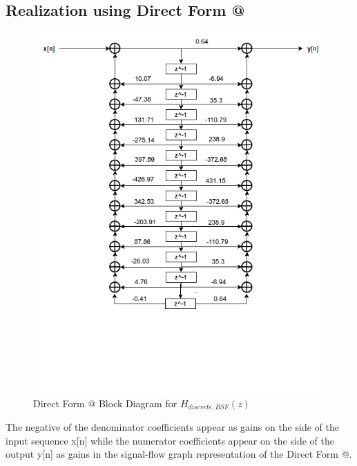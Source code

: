 \documentclass[12pt]{article}
\makeatletter
\newcommand{\Rmnum}[1]{\expandafter\@slowromancap\romannumeral #1@}
\makeatother
\begin{document}
\subsection{Realization using Direct Form \Rmnum{2}}
\begin{figure}[h!]
	\centering	
	\includegraphics[scale = 0.6]{Butterworth_DirectForm_2.png}
    \caption{Direct Form \Rmnum{2} Block Diagram for $H_{discrete,BSF}(z)$}
\end{figure}

The negative of the denominator coefficients appear as gains on the side of the input sequence x[n] while the numerator coefficients appear on the side of the output y[n] as gains in the signal-flow graph representation of the Direct Form \Rmnum{2}.  
\end{document}
